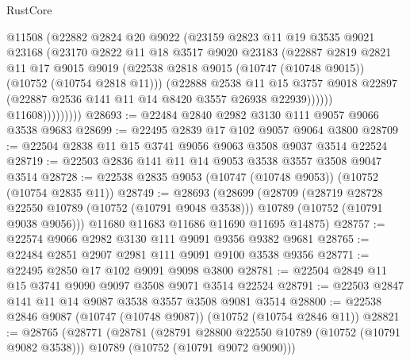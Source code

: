 \begin{lexlean}{RustCore}
\begin{coremodule}
                      @11508
                      (@22882
                        @2824
                        @20
                        @9022
                        (@23159
                          @2823
                          @11
                          @19
                          @3535
                          @9021
                          @23168
                          (@23170
                            @2822
                            @11
                            @18
                            @3517
                            @9020
                            @23183
                            (@22887
                              @2819
                              @2821
                              @11
                              @17
                              @9015
                              @9019
                              (@22538
                                @2818
                                @9015
                                (@10747 (@10748 @9015))
                                (@10752 (@10754 @2818 @11)))
                              (@22888
                                @2538
                                @11
                                @15
                                @3757
                                @9018
                                @22897
                                (@22887 @2536 @141 @11 @14 @8420 @3557 @26938 @22939))))))
                      @11608)))))))))
@28693 := @22484 @2840 @2982 @3130 @111 @9057 @9066 @3538 @9683
@28699 := @22495 @2839 @17 @102 @9057 @9064 @3800
@28709 := @22504 @2838 @11 @15 @3741 @9056 @9063 @3508 @9037 @3514 @22524
@28719 := @22503 @2836 @141 @11 @14 @9053 @3538 @3557 @3508 @9047 @3514
@28728 := @22538 @2835 @9053 (@10747 (@10748 @9053)) (@10752 (@10754 @2835 @11))
@28749 := @28693
    (@28699
      (@28709
        (@28719 @28728 @22550 @10789 (@10752 (@10791 @9048 @3538)))
        @10789
        (@10752 (@10791 @9038 @9056)))
      @11680
      @11683
      @11686
      @11690
      @11695
      @14875)
@28757 := @22574 @9066 @2982 @3130 @111 @9091 @9356 @9382 @9681
@28765 := @22484 @2851 @2907 @2981 @111 @9091 @9100 @3538 @9356
@28771 := @22495 @2850 @17 @102 @9091 @9098 @3800
@28781 := @22504 @2849 @11 @15 @3741 @9090 @9097 @3508 @9071 @3514 @22524
@28791 := @22503 @2847 @141 @11 @14 @9087 @3538 @3557 @3508 @9081 @3514
@28800 := @22538 @2846 @9087 (@10747 (@10748 @9087)) (@10752 (@10754 @2846 @11))
@28821 := @28765
    (@28771
      (@28781
        (@28791 @28800 @22550 @10789 (@10752 (@10791 @9082 @3538)))
        @10789
        (@10752 (@10791 @9072 @9090)))

\end{coremodule}
\end{lexlean}
